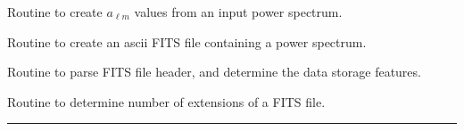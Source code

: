 \begin{related}
  \begin{sulist}{} %
  \item[\htmlref{create\_alm}{sub:create_alm}] Routine to create $a_{\ell m}$ values
  from an input power spectrum.
  \item[\htmlref{write\_asctab}{sub:write_asctab}] Routine to create an ascii
  FITS file containing a power spectrum.
  \item[\htmlref{getsize\_fits}{sub:getsize_fits}] Routine to parse FITS file header, and determine the data storage features.
  \item[\htmlref{getnumext\_fits}{sub:getnumext_fits}] Routine to determine number of extensions of a FITS file.
  \end{sulist}
\end{related}

\rule{\hsize}{2mm}

\newpage
